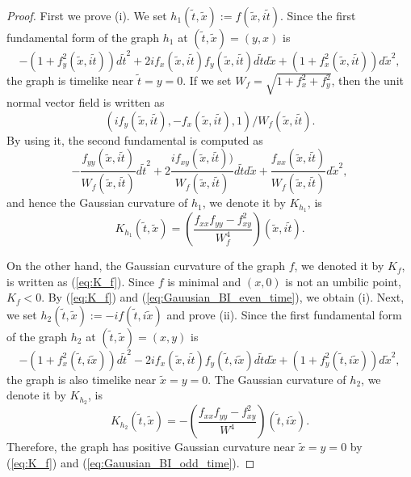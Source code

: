 \documentclass[12pt,amstex]{amsart}%
\theoremstyle{plain} %
\theoremstyle{definition}
\begin{document}
\begin{proof}
First we prove (i). We set $h_1(\tilde{t},\tilde{x}):=f(\tilde{x},i\tilde{t})$. Since the first fundamental form of the graph $h_1$ at $(\tilde{t},\tilde{x})=(y,x)$ is
\[
-(1+f_y^2(\tilde{x},i\tilde{t}))d\tilde{t}^2+2if_x(\tilde{x},i\tilde{t})f_y(\tilde{x},i\tilde{t})d\tilde{t}d\tilde{x}+(1+f_x^2(\tilde{x},i\tilde{t}))d\tilde{x}^2,
\]
the graph is timelike near $\tilde{t}=y=0$. If we set $W_f=\sqrt{1+f_x^2+f_y^2}$, then the unit normal vector field is written as
\[
(if_y(\tilde{x},i\tilde{t}),-f_x(\tilde{x},i\tilde{t}),1)/{W_f(\tilde{x},i\tilde{t})}.
\]
By using it, the second fundamental is computed as
\[
-\frac{f_{yy}(\tilde{x},i\tilde{t})}{W_f(\tilde{x},i\tilde{t})}d\tilde{t}^2+2\frac{if_{xy}(\tilde{x},i\tilde{t}))}{W_f(\tilde{x},i\tilde{t})}d\tilde{t}d\tilde{x}+\frac{f_{xx}(\tilde{x},i\tilde{t})}{W_f(\tilde{x},i\tilde{t})}d\tilde{x}^2,
\]
and hence the Gaussian curvature of $h_1$, we denote it by $K_{h_1}$,  is
\begin{equation}\label{eq:Gauusian_BI_even_time}
K_{h_1}(\tilde{t},\tilde{x})=\left(\frac{f_{xx}f_{yy}-f_{xy}^2}{W_f^4}\right)(\tilde{x},i\tilde{t}).
\end{equation}

On the other hand, the Gaussian curvature of the graph $f$, we denoted it by $K_f$, is written as (\ref{eq:K_f}). Since $f$ is minimal and $(x,0)$ is not an umbilic point, $K_f<0$. By (\ref{eq:K_f}) and (\ref{eq:Gauusian_BI_even_time}), we obtain (i). Next, we set $h_2(\tilde{t},\tilde{x}):=-if(\tilde{t},i\tilde{x})$ and prove (ii). Since the first fundamental form of the graph $h_2$ at $(\tilde{t},\tilde{x})=(x,y)$ is
\[
-(1+f_x^2(\tilde{t},i\tilde{x}))d\tilde{t}^2-2if_x(\tilde{x},i\tilde{t})f_y(\tilde{t},i\tilde{x})d\tilde{t}d\tilde{x}+(1+f_y^2(\tilde{t},i\tilde{x}))d\tilde{x}^2,
\]
the graph is also timelike near $\tilde{x}=y=0$. The Gaussian curvature of $h_2$, we denote it by $K_{h_2}$,  is
\begin{equation}\label{eq:Gauusian_BI_odd_time}
K_{h_2}(\tilde{t},\tilde{x})=-\left(\frac{f_{xx}f_{yy}-f_{xy}^2}{W^4}\right)(\tilde{t},i\tilde{x}).
\end{equation}
Therefore, the graph has positive Gaussian curvature near $\tilde{x}=y=0$ by (\ref{eq:K_f}) and (\ref{eq:Gauusian_BI_odd_time}).
\end{proof}
\end{document}
